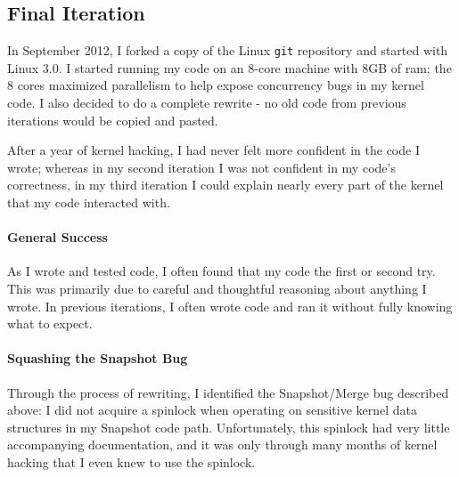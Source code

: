 \subsection{Final Iteration}
In September 2012, I forked a copy of the Linux {\tt git} repository and
started with Linux 3.0. I started running my code on an 8-core machine with
8GB of ram; the 8 cores maximized parallelism to help expose concurrency
bugs in my kernel code. I also decided to do a complete rewrite - no old code
from previous iterations would be copied and pasted.

After a year of kernel hacking, I had never felt more confident in the code I
wrote; whereas in my second iteration I was not confident in my code's
correctness, in my third iteration I could explain nearly every part of the
kernel that my code interacted with.

\paragraph{General Success}
As I wrote and tested code, I often found that my code the first or second
try. This was primarily due to careful and thoughtful reasoning about anything
I wrote. In previous iterations, I often wrote code and ran it without fully
knowing what to expect.

\paragraph{Squashing the Snapshot Bug}
Through the process of rewriting, I identified the Snapshot/Merge bug described
above: I did not acquire a spinlock when operating on sensitive kernel data
structures in my Snapshot code path. Unfortunately, this spinlock had very
little accompanying documentation, and it was only through many months of
kernel hacking that I even knew to use the spinlock.

\endinput

